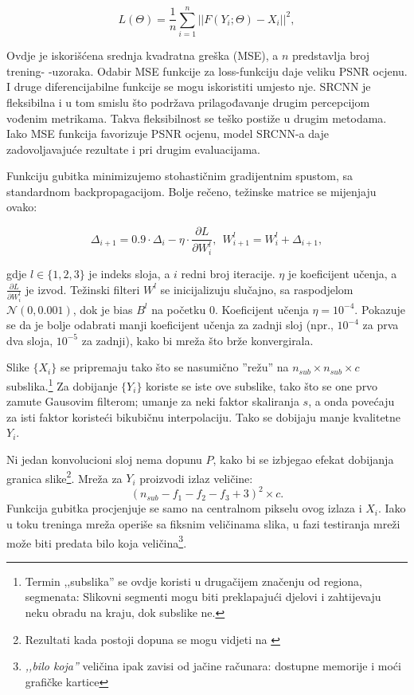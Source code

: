 \documentclass[12pt]{report}
\numberwithin{equation}{section}
\begin{document}
\begin{equation}
  L(\Theta) = \frac{1}{n} \sum\limits_{i=1}^{n}{||F(Y_i; \Theta) - X_i ||}^2 ,
\end{equation}

Ovdje je iskorišćena srednja kvadratna greška (MSE), a $n$ predstavlja broj trening-
-uzoraka. Odabir MSE funkcije za loss-funkciju daje veliku PSNR ocjenu. I druge diferencijabilne funkcije se mogu iskoristiti umjesto nje. SRCNN je fleksibilna i u tom smislu što podržava prilagođavanje drugim percepcijom vođenim metrikama. Takva fleksibilnost se teško postiže u drugim metodama. Iako MSE funkcija favorizuje PSNR ocjenu, model SRCNN-a daje zadovoljavajuće rezultate i pri drugim evaluacijama.

Funkciju gubitka minimizujemo stohastičnim gradijentnim spustom, sa standardnom backpropagacijom. Bolje rečeno, težinske matrice se mijenjaju ovako: 

\begin{equation}
  \Delta_{i+1} = 0.9 \cdot \Delta_i - \eta \cdot \frac{\partial L}{\partial W_{i}^{l}}, \ \ W_{i+1}^{l}=W_{i}^{l}+\Delta_{i+1},
\end{equation}
 


gdje $l \in \{ 1, 2, 3 \}$ je indeks sloja, a $i$ redni broj iteracije. $\eta$ je koeficijent učenja, a $\frac{\partial L}{\partial W_i^l}$ je izvod. Težinski filteri ${W^l}$ se inicijalizuju slučajno, sa raspodjelom $\mathcal{N}(0, 0.001)$, dok je bias ${B^l}$ na početku $0$. Koeficijent učenja $\eta = 10^{-4}$. Pokazuje se da je bolje odabrati manji koeficijent učenja za zadnji sloj (npr., $10^{-4}$ za prva dva sloja, $10^{-5}$ za zadnji), kako bi mreža što brže konvergirala. 

Slike $\{X_i\}$ se pripremaju tako što se nasumično ''režu'' na $n_{sub} \times n_{sub} \times c$ subslika.\footnote{Termin ,,subslika'' se ovdje koristi u drugačijem značenju od regiona, segmenata: Slikovni segmenti mogu biti preklapajući djelovi i zahtijevaju neku obradu na kraju, dok subslike ne.} Za dobijanje $\{Y_i\}$ koriste se iste ove subslike, tako što se one prvo zamute Gausovim filterom; umanje za neki faktor skaliranja $s$, a onda povećaju za isti faktor koristeći bikubičnu interpolaciju. Tako se dobijaju manje kvalitetne ${Y_i}$. 

Ni jedan konvolucioni sloj nema dopunu $P$, kako bi se izbjegao efekat dobijanja granica slike\footnote{Rezultati kada postoji dopuna se mogu vidjeti na \cite{samples}}. Mreža za $Y_i$ proizvodi izlaz veličine: 
\begin{equation}\label{eq:size}
(n_{sub} - f_1 - f_2 - f_3 + 3 )^2 \times c. 
\end{equation}
Funkcija gubitka procjenjuje se samo na centralnom pikselu ovog izlaza i $X_i$. Iako u toku treninga mreža operiše sa fiksnim veličinama slika, u fazi testiranja mreži može biti predata bilo koja veličina\footnote{\textit{,,bilo koja''} veličina ipak zavisi od jačine računara: dostupne memorije i moći grafičke kartice}.   
\end{document}
